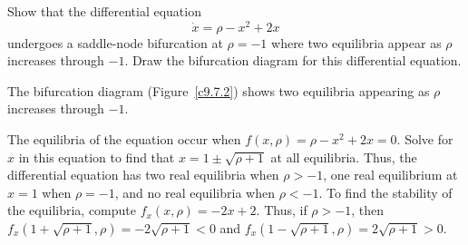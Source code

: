 \documentclass{ximera}
\begin{document}
\begin{exercise} \label{c9.7.2}
Show that the differential equation
\[
\dot{x} = \rho - x^2 + 2x
\]
undergoes a saddle-node bifurcation at $\rho=-1$ where two equilibria
appear as $\rho$ increases through $-1$.  Draw the bifurcation diagram
for this differential equation.

\begin{solution}

\ans The bifurcation diagram (Figure~\ref{c9.7.2}) shows two equilibria
appearing as $\rho$ increases through $-1$.

\soln The equilibria of the equation occur when $f(x,\rho) = \rho - x^2 +
2x = 0$.  Solve for $x$ in this equation to find that $x = 1 \pm
\sqrt{\rho + 1}$ at all equilibria.  Thus, the differential equation has
two real equilibria when $\rho > -1$, one real equilibrium at $x = 1$ when
$\rho = -1$, and no real equilibria when $\rho < -1$.  To find the
stability of the equilibria, compute $f_x(x,\rho) = -2x + 2$.  Thus, if
$\rho > -1$, then
$f_x(1 + \sqrt{\rho + 1},\rho) = -2\sqrt{\rho + 1} < 0$ and
$f_x(1 - \sqrt{\rho + 1},\rho) = 2\sqrt{\rho + 1} > 0$.

\begin{figure}[htb]
                       \centerline{%
                       }
\end{figure}

\end{solution}
\end{exercise}
\end{document}

